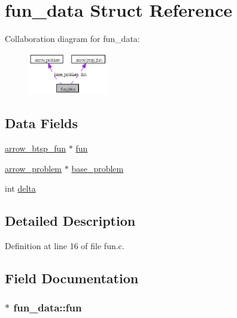 \hypertarget{structfun__data}{
\section{fun\_\-data Struct Reference}
\label{structfun__data}
}
Collaboration diagram for fun\_\-data:\nopagebreak
\begin{figure}[H]
\begin{center}
\leavevmode
\includegraphics[width=98pt]{structfun__data__coll__graph}
\end{center}
\end{figure}
\subsection*{Data Fields}
\begin{CompactItemize}
\item 
\hyperlink{structarrow__btsp__fun}{arrow\_\-btsp\_\-fun} $\ast$ \hyperlink{structfun__data_a4103cadf3d844dc528d9e02884cfc98}{fun}
\item 
\hyperlink{structarrow__problem}{arrow\_\-problem} $\ast$ \hyperlink{structfun__data_8975a7eed7c3a3fa00f7a15c54e1c80b}{base\_\-problem}
\item 
int \hyperlink{structfun__data_1d0479ab1ce43aa65ba7cac44874d414}{delta}
\end{CompactItemize}


\subsection{Detailed Description}


Definition at line 16 of file fun.c.

\subsection{Field Documentation}
\hypertarget{structfun__data_a4103cadf3d844dc528d9e02884cfc98}{
\subsubsection{$\ast$ {\bf fun\_\-data::fun}}}
\label{structfun__data_a4103cadf3d844dc528d9e02884cfc98}


